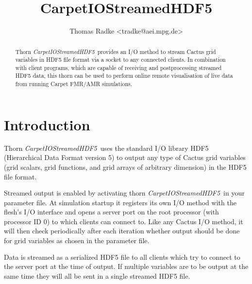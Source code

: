 \documentclass{article}
\begin{document}
\author{Thomas Radke \textless tradke@aei.mpg.de\textgreater}

\title{CarpetIOStreamedHDF5}

\date{}

\maketitle


\ifx\ThisThorn\undefined
\newcommand{\ThisThorn}{{\it CarpetIOStreamedHDF5}}
\else
\renewcommand{\ThisThorn}{{\it CarpetIOStreamedHDF5}}
\fi

\begin{abstract}
Thorn \ThisThorn\ provides an I/O method to stream Cactus grid
variables in HDF5 file format via a socket to any connected clients.
In combination with client programs, which are capable of receiving and
postprocessing streamed HDF5 data, this thorn can be used to perform online
remote visualisation of live data from running Carpet FMR/AMR simulations.
\end{abstract}


\section{Introduction}

Thorn \ThisThorn\ uses the standard I/O library HDF5 (Hierarchical
Data Format version 5) to output any type of Cactus grid variables
(grid scalars, grid functions, and grid arrays of arbitrary dimension)
in the HDF5 file format.

Streamed output is enabled by activating thorn \ThisThorn\ in your parameter
file. At simulation startup it registers its own I/O method with the
flesh's I/O interface and opens a server port on the root processor
(with processor ID 0) to which clients can connect to.
Like any Cactus I/O method, it will then check periodically after each iteration
whether output should be done for grid variables as chosen in the
parameter file.

Data is streamed as a serialized HDF5 file to all clients which try to
connect to the server port at the time of output. If multiple variables are to
be output at the same time they will all be sent in a single streamed HDF5 file.
\end{document}
